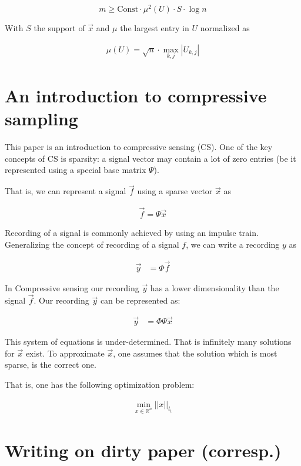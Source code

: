 \documentclass[report, oneside, a4paper, openany]{memoir}
\begin{document}
\begin{equation}
	m \geq \text{Const}\cdot \mu^2(U) \cdot S \cdot \log n
\end{equation}

With $S$ the support of $\vec{x}$ and $\mu$ the largest entry in $U$ normalized as

\begin{align*}
	\mu(U) = \sqrt{n} \cdot \max_{k,j} |U_{k,j}|
\end{align*}
\section{An introduction to compressive sampling \cite{candes2008introduction}}
This paper is an introduction to compressive sensing (CS). One of the key concepts of CS is sparsity: a signal vector may contain a lot of zero entries (be it represented using a special base matrix $\Psi$).

That is, we can represent a signal $\vec{f}$ using a sparse vector $\vec{x}$ as

\begin{align*}
  \vec{f} = \Psi \vec{x}
\end{align*}

Recording of a signal is commonly achieved by using an impulse train. Generalizing the concept of recording of a signal $f$, we can write a recording $y$ as

\begin{align*}
  \vec{y} &= \Phi \vec{f}
\end{align*}

In Compressive sensing our recording $\vec{y}$ has a lower dimensionality than
the signal $\vec{f}$. Our recording $\vec{y}$ can be represented as:

\begin{align} \label{eq:recording-system}
  \vec{y} &= \Phi \Psi \vec{x}
\end{align}

This system of equations is under-determined. That is
infinitely many solutions for $\vec{x}$ exist. To approximate $\vec{x}$, one assumes that the solution which is most sparse, is the correct one.

That is, one has the following optimization problem:

\begin{align*}
  \min_{x \in \mathbb{R}^n} ||x||_{l_1}
\end{align*}
\section{Writing on dirty paper (corresp.) \cite{costa1983writing}}
\end{document}

